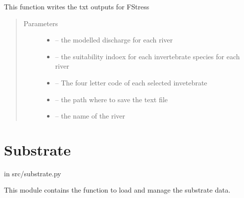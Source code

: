 \documentclass[letterpaper,10pt,english]{sphinxmanual}
\begin{document}

\begin{fulllineitems}
\label{\detokenize{index:src.fstress.write_txt}}
This function writes the txt outputs for FStress
\begin{quote}\begin{description}
\item[{Parameters}] \leavevmode\begin{itemize}
\item {} 
 -- the modelled discharge for each river

\item {} 
 -- the suitability indoex for each invertebrate species for each river

\item {} 
 -- The four letter code of each selected invetebrate

\item {} 
 -- the path where to save the text file

\item {} 
 -- the name of the river

\end{itemize}

\end{description}\end{quote}

\end{fulllineitems}



\section{Substrate}
\label{\detokenize{index:substrate}}
in src/substrate.py

This module contains the function to load and manage the substrate data.
\label{\detokenize{index:module-src.substrate}}
\end{document}
